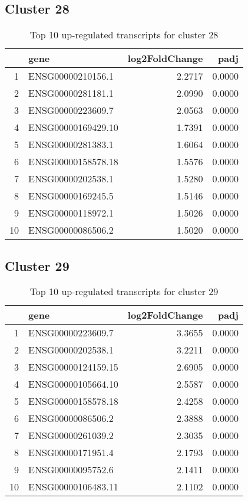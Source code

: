 \documentclass{article}
\begin{document}
\subsection{Cluster 28 }
\begin{table}[H]
\centering
\begin{tabularx}{\textwidth}{rlrr}
  \hline
 & gene & log2FoldChange & padj \\ 
  \hline
1 & ENSG00000210156.1 & 2.2717 & 0.0000 \\ 
  2 & ENSG00000281181.1 & 2.0990 & 0.0000 \\ 
  3 & ENSG00000223609.7 & 2.0563 & 0.0000 \\ 
  4 & ENSG00000169429.10 & 1.7391 & 0.0000 \\ 
  5 & ENSG00000281383.1 & 1.6064 & 0.0000 \\ 
  6 & ENSG00000158578.18 & 1.5576 & 0.0000 \\ 
  7 & ENSG00000202538.1 & 1.5280 & 0.0000 \\ 
  8 & ENSG00000169245.5 & 1.5146 & 0.0000 \\ 
  9 & ENSG00000118972.1 & 1.5026 & 0.0000 \\ 
  10 & ENSG00000086506.2 & 1.5020 & 0.0000 \\ 
   \hline
\end{tabularx}
\caption{Top 10 up-regulated transcripts for cluster 28} 
\label{tab:q3_1_28}
\end{table}
\subsection{Cluster 29 }
\begin{table}[H]
\centering
\begin{tabularx}{\textwidth}{rlrr}
  \hline
 & gene & log2FoldChange & padj \\ 
  \hline
1 & ENSG00000223609.7 & 3.3655 & 0.0000 \\ 
  2 & ENSG00000202538.1 & 3.2211 & 0.0000 \\ 
  3 & ENSG00000124159.15 & 2.6905 & 0.0000 \\ 
  4 & ENSG00000105664.10 & 2.5587 & 0.0000 \\ 
  5 & ENSG00000158578.18 & 2.4258 & 0.0000 \\ 
  6 & ENSG00000086506.2 & 2.3888 & 0.0000 \\ 
  7 & ENSG00000261039.2 & 2.3035 & 0.0000 \\ 
  8 & ENSG00000171951.4 & 2.1793 & 0.0000 \\ 
  9 & ENSG00000095752.6 & 2.1411 & 0.0000 \\ 
  10 & ENSG00000106483.11 & 2.1102 & 0.0000 \\ 
   \hline
\end{tabularx}
\caption{Top 10 up-regulated transcripts for cluster 29} 
\label{tab:q3_1_29}
\end{table}
\end{document}
